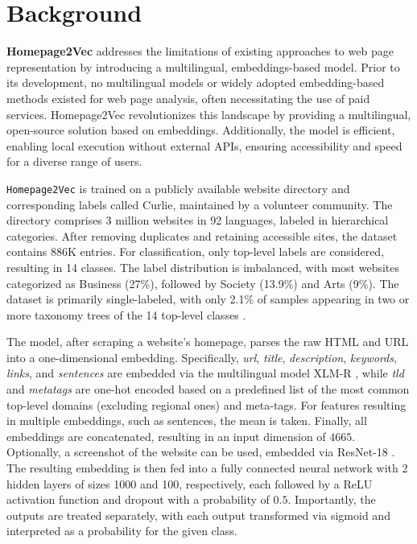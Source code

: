 \section{Background}\label{sec:background}

\textbf{Homepage2Vec} addresses the limitations of existing approaches to web page representation by introducing a multilingual, embeddings-based model. Prior to its development, no multilingual models or widely adopted embedding-based methods existed for web page analysis, often necessitating the use of paid services. Homepage2Vec revolutionizes this landscape by providing a multilingual, open-source solution based on embeddings. Additionally, the model is efficient, enabling local execution without external APIs, ensuring accessibility and speed for a diverse range of users.

\texttt{Homepage2Vec} is trained on a publicly available website directory and corresponding labels called Curlie, maintained by a volunteer community. The directory comprises 3 million websites in 92 languages, labeled in hierarchical categories. After removing duplicates and retaining accessible sites, the dataset contains 886K entries. For classification, only top-level labels are considered, resulting in 14 classes.  The label distribution is imbalanced, with most websites categorized as Business (27\%), followed by Society (13.9\%) and Arts (9\%). The dataset is primarily single-labeled, with only 2.1\% of samples appearing in two or more taxonomy trees of the 14 top-level classes \cite{homepage2vec}.

The model, after scraping a website's homepage, parses the raw HTML and URL into a one-dimensional embedding. Specifically, \textit{url}, \textit{title}, \textit{description}, \textit{keywords}, \textit{links}, and \textit{sentences} are embedded via the multilingual model XLM-R \cite{xmlr}, while \textit{tld} and \textit{metatags} are one-hot encoded based on a predefined list of the most common top-level domains (excluding regional ones) and meta-tags. For features resulting in multiple embeddings, such as sentences, the mean is taken. Finally, all embeddings are concatenated, resulting in an input dimension of $4665$. Optionally, a screenshot of the website can be used, embedded via ResNet-18 \cite{resnet}. The resulting embedding is then fed into a fully connected neural network with 2 hidden layers of sizes 1000 and 100, respectively, each followed by a ReLU activation function and dropout with a probability of $0.5$. Importantly, the outputs are treated separately, with each output transformed via sigmoid and interpreted as a probability for the given class.

